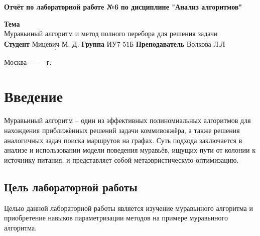 \documentclass[12pt]{report}
\begin{document}
\begin{titlepage}
		
		\begin{center}
			\noindent\begin{minipage}{1.3\textwidth}\centering
				\Large\textbf{  Отчёт по лабораторной работе №6}\newline
				\textbf{по дисциплине "Анализ алгоритмов"}\newline\newline
			\end{minipage}
		\end{center}
		
		\noindent\textbf{Тема} $\underline{\text{Муравьиный алгоритм и метод полного перебора для решения задачи коммивояжёра}}$\newline
		\noindent\textbf{Студент} $\underline{\text{Мицевич М. Д.}}$\newline
		\noindent\textbf{Группа} $\underline{\text{ИУ7-51Б}}$\newline
		\noindent\textbf{Преподаватель} $\underline{\text{Волкова Л.Л}}$\newline\newline\newline\newline
		
		\begin{center}
			\vfill
			Москва~---~\the\year
			~г.
		\end{center}
	\end{titlepage}
	
	
	\tableofcontents
	
\newpage
\chapter*{Введение}
	
Муравьиный алгоритм -- один из эффективных полиномиальных алгоритмов для нахождения приближённых решений задачи коммивояжёра, а также решения аналогичных задач поиска маршрутов на графах. Суть подхода заключается в анализе и использовании модели поведения муравьёв, ищущих пути от колонии к источнику питания, и представляет собой метаэвристическую оптимизацию.
	
\section*{Цель лабораторной работы}
	
Целью данной лабораторной работы является изучение муравьиного алгоритма и приобретение навыков параметризации методов на примере муравьиного алгоритма.
	
\end{document}
